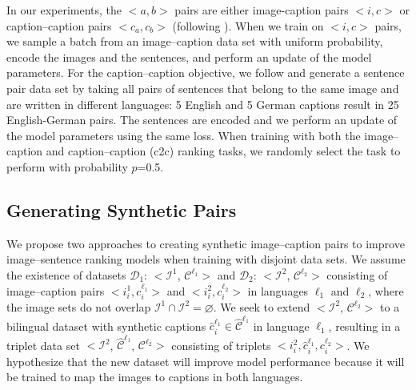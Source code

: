In our experiments, the $<a, b>$ pairs are either image-caption pairs 
$<i, c>$ or caption--caption pairs $<c_a, c_b>$ (following \cite{gella2017image,kadar2018conll}).
When we train on $<i, c>$ pairs, we sample a batch
from an image--caption data set with uniform probability, encode the images and the sentences, and perform an update of the model parameters.
For the caption--caption objective, 
we follow \cite{kadar2018conll} and 
generate a sentence pair data set
by taking all pairs of sentences 
that belong to the same image
and are written in different languages: 5 English
and 5 German captions result in 25 English-German 
pairs. 
The sentences are encoded and we perform an update of 
the model parameters using the same loss. 
When training with both the image--caption and 
caption--caption (c2c) ranking tasks, 
we randomly select the task to perform with 
probability $p$=0.5. 

\subsection{Generating Synthetic Pairs}\label{sec:method:synthetic}

We propose two approaches to creating synthetic image--caption pairs to improve image--sentence ranking models when training with disjoint data sets. We assume the existence of datasets 
$\mathcal{D}_1$: $<\mathcal{I}^1$, $\mathcal{C}^{\ell_1}>$ and
$\mathcal{D}_2$: $<\mathcal{I}^2$, $\mathcal{C}^{\ell_2}>$
consisting of image--caption pairs $<i^1_i, c^{\ell_1}_i>$ and 
$<i^2_i, c^{\ell_2}_i>$ in 
languages $\ell_1$ and $\ell_2$, where the image sets do not overlap 
$\mathcal{I}^1 \cap \mathcal{I}^2 = \varnothing$. 
We seek to extend $<\mathcal{I}^2$, $\mathcal{C}^{\ell_2}>$ 
to a bilingual dataset with synthetic captions
$\hat{c}^{\ell_1}_i \in \hat{\mathcal{C}}^{\ell_1}$ 
in language $\ell_1$, resulting in a triplet data set 
$<\mathcal{I}^2$, $\hat{\mathcal{C}}^{\ell_1}$, $\mathcal{C}^{\ell_2}>$ 
consisting of triplets
 $<i^2_i, \hat{c}^{\ell_1}_i, c^{\ell_2}_i>$.
 We hypothesize that the new dataset will improve model performance because it will be trained to map the images to captions in both languages.%
 

